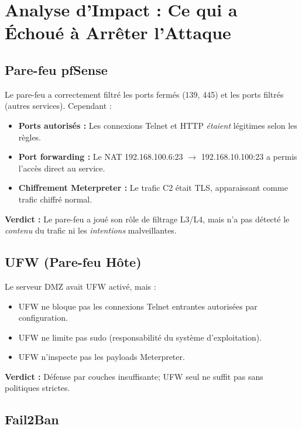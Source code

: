 \documentclass[12pt,a4paper,openany]{report}
\begin{document}
\section{Analyse d'Impact : Ce qui a Échoué à Arrêter l'Attaque}

\subsection{Pare-feu pfSense}

Le pare-feu a correctement filtré les ports fermés (139, 445) et les ports filtrés (autres services). Cependant :

\begin{itemize}
	\item \textbf{Ports autorisés :} Les connexions Telnet et HTTP \textit{étaient} légitimes selon les règles.
	\item \textbf{Port forwarding :} Le NAT 192.168.100.6:23 $\rightarrow$ 192.168.10.100:23 a permis l'accès direct au service.
	\item \textbf{Chiffrement Meterpreter :} Le trafic C2 était TLS, apparaissant comme trafic chiffré normal.
\end{itemize}

\textbf{Verdict :} Le pare-feu a joué son rôle de filtrage L3/L4, mais n'a pas détecté le \textit{contenu} du trafic ni les \textit{intentions} malveillantes.

\subsection{UFW (Pare-feu Hôte)}

Le serveur DMZ avait UFW activé, mais :

\begin{itemize}
	\item UFW ne bloque pas les connexions Telnet entrantes autorisées par configuration.
	\item UFW ne limite pas sudo (responsabilité du système d'exploitation).
	\item UFW n'inspecte pas les payloads Meterpreter.
\end{itemize}

\textbf{Verdict :} Défense par couches insuffisante; UFW seul ne suffit pas sans politiques strictes.

\subsection{Fail2Ban}
\end{document}
